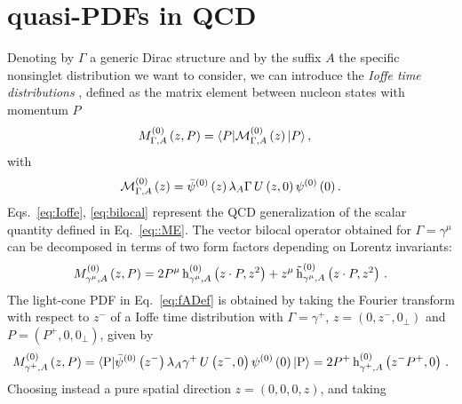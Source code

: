 
\section{quasi-PDFs in QCD}
%
Denoting by $\Gamma$ a generic Dirac structure and by the suffix $A$ the specific nonsinglet distribution
we want to consider, we can introduce the {\em Ioffe time distributions} \cite{Radyushkin:2017cyf,Braun:1994jq}, 
defined as the matrix element between nucleon states with momentum $P$
\begin{align}
	\label{eq:Ioffe}
	M^{(0)}_{\Gamma,A}\left(z,P\right) &= \langle P |\mathcal{M}^{(0)}_{\Gamma,A}\left(z\right) |P\rangle \, ,
\end{align}
with
\begin{align}
	\label{eq:bilocal}
	\mathcal{M}^{(0)}_{\Gamma,A}\left(z\right)= \bar{\psi}^{(0)}\left( z\right) \lambda_A \Gamma \,   
	U\left( z,0\right) \psi^{(0)}\left( 0\right).
\end{align}
Eqs.~\eqref{eq:Ioffe}, \eqref{eq:bilocal} represent the QCD generalization of the scalar quantity defined 
in Eq.~\eqref{eq::ME}.
The vector bilocal operator obtained for $\Gamma=\gamma^\mu$ can be decomposed
in terms of two form factors depending on Lorentz invariants:
\[
    \label{eq:IoffeDecomposition}
    M^{(0)}_{\gamma^\mu,A}\left(z, P\right)
    = 2 P^\mu\,\text{h}^{(0)}_{\gamma^\mu,A}\left( z\cdot P,z^2 \right)
    + z^\mu\, \tilde{\text{h}}^{(0)}_{\gamma^{\mu},A}\left( z\cdot P,z^2 \right) \, . 
\]
The light-cone PDF in Eq.~\eqref{eq:fADef} is obtained by taking the Fourier
transform with respect to $z^-$ of a Ioffe time distribution with $\Gamma =
\gamma^+$, $z=\left(0,z^-,0_{\perp}\right)$ and $P=(P^+,0,0_{\perp})$, given
by
\begin{align}
	\label{eq:Ioffelightcone}
    M^{(0)}_{\gamma^+,A}\left(z,P\right) =  
    \langle \text{P}|\bar{\psi}^{(0)}\left( z^-\right) \lambda_A \gamma^+ \,   
	U\left( z^-,0\right) \psi^{(0)}\left( 0\right)  |\text{P}\rangle
	= 2 P^+\,\text{h}^{(0)}_{\gamma^+,A}\left( z^- P^+,0 \right)\, .
\end{align} 
Choosing instead a pure spatial direction $z=\left(0,0,0,z\right)$, and taking
